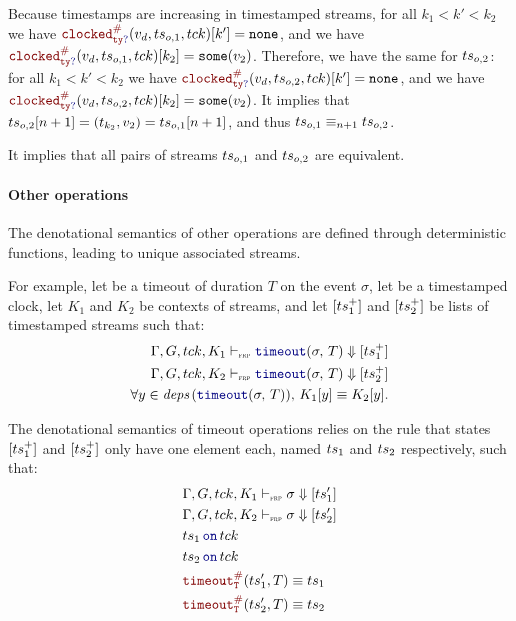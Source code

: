 \begin{skippableproof}
\begin{itemize}
\begin{itemize}
                        Because timestamps are increasing in timestamped streams, for all
                        $k_1 < k' < k_2$ we have $\clocked{\mayB{ty}}{v_d}{\ts_{o, 1}}{\tck}[k'] = \none$,
                        and we have $\clocked{\mayB{ty}}{v_d}{\ts_{o, 1}}{\tck}[k_2] = \some{v_2}$.
                        Therefore, we have the same for $ts_{o, 2}$: for all $k_1 < k' < k_2$ we
                        have $\clocked{\mayB{ty}}{v_d}{\ts_{o, 2}}{\tck}[k'] = \none$,
                        and we have $\clocked{\mayB{ty}}{v_d}{\ts_{o, 2}}{\tck}[k_2] = \some{v_2}$.
                        It implies that $ts_{o, 2}[n+1] = (t_{k_2}, v_2) = ts_{o, 1}[n+1]$, and thus
                        $ts_{o, 1} \equiv_{n+1} ts_{o, 2}$.
              \end{itemize}
    \end{itemize}

    It implies that all pairs of streams $ts_{o, 1}$ and $ts_{o, 2}$ are equivalent.

    \paragraph{Other operations}

    The denotational semantics of other operations are defined through deterministic functions,
    leading to unique associated streams.

    For example, let  be a timeout of duration $T$ on the event $\sigma$, let
    \tck be a timestamped clock, let $K_1$ and $K_2$ be contexts of streams, and let $[ts_1^+]$ and
    $[ts_2^+]$ be lists of timestamped streams such that:
    \begin{align*}
        \sigmaDenot{\tck}{K_1}{\timeout{\sigma}{T}}{\ts_1^+} \\
        \sigmaDenot{\tck}{K_2}{\timeout{\sigma}{T}}{\ts_2^+} \\
        \forall y \in \depSet{\timeout{\sigma}{T}}, \, K_1[y] \equiv K_2[y].
    \end{align*}

    The denotational semantics of timeout operations relies on the rule  that states $[ts_1^+]$ and $[ts_2^+]$ only have one element each,
    named $ts_1$ and $ts_2$ respectively, such that:
    \begin{align*}
         & \sigmaDenot{\tck}{K_1}{\sigma}{\ts'_1} \\
         & \sigmaDenot{\tck}{K_2}{\sigma}{\ts'_2} \\
         & \on{\ts_1}{\tck}                       \\
         & \on{\ts_2}{\tck}                       \\
         & \timeoutAux{\ts'_1}{T}{T} \equiv \ts_1 \\
         & \timeoutAux{\ts'_2}{T}{T} \equiv \ts_2
    \end{align*}


\end{skippableproof}
